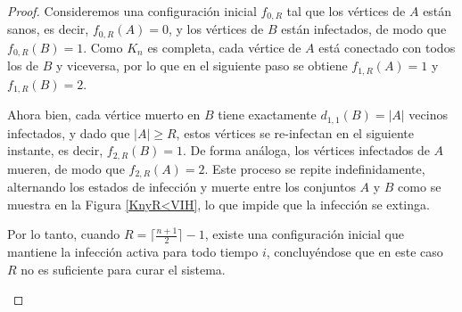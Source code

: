 \documentclass[12pt,titlepage,twoside,openright]{book}
\begin{document}
\begin{proof}
    Consideremos una configuraci\'on inicial $f_{0,R}$ tal que los v\'ertices de $A$ est\'an sanos, es decir, $f_{0,R}(A)=0$, y los v\'ertices de $B$ est\'an infectados, de modo que $f_{0,R}(B)=1$. Como $K_n$ es completa, cada v\'ertice de $A$ est\'a conectado con todos los de $B$ y viceversa, por lo que en el siguiente paso se obtiene $f_{1,R}(A)=1$ y $f_{1,R}(B)=2$.

    Ahora bien, cada v\'ertice muerto en $B$ tiene exactamente $d_{1,1}(B)=|A|$ vecinos infectados, y dado que $|A|\ge R$, estos v\'ertices se re-infectan en el siguiente instante, es decir, $f_{2,R}(B)=1$. De forma an\'aloga, los v\'ertices infectados de $A$ mueren, de modo que $f_{2,R}(A)=2$. Este proceso se repite indefinidamente, alternando los estados de infecci\'on y muerte entre los conjuntos $A$ y $B$ como se muestra en la Figura \ref{KnyR<VIH}, lo que impide que la infecci\'on se extinga. 
    
    Por lo tanto, cuando $R=\lceil \tfrac{n+1}{2}\rceil-1$, existe una configuraci\'on inicial que mantiene la infecci\'on activa para todo tiempo $i$, concluy\'endose que en este caso $R$ no es suficiente para curar el sistema.

    \begin{figure}[h!]
    \centering
\end{figure}
\end{proof}
\end{document}

